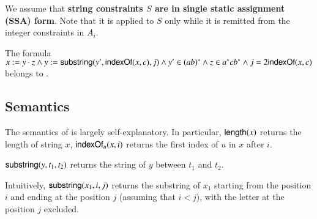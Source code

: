 {%
We assume that {\bf  string constraints %
$S$ are in single static assignment (SSA) form}.  %
Note that it is applied  to $S$ only while it is remitted from the integer constraints in $A_i$. 
%
%

\begin{example}
The formula $x:= y \cdot z \wedge y := \mathsf{substring}(y', \mathsf{indexOf}(x, c), j)  \wedge y' \in (ab)^* \wedge z \in a^* c b^* \wedge   j = 2 \mathsf{indexOf}(x, c)$ belongs to \slint.
\end{example}


\subsection{Semantics}

The semantics of  {\slint}  is largely self-explanatory. In particular, $\mathsf{length}(x)$ returns the length of string $x$, $\mathsf{indexOf}_u(x, i)$ returns the first index of $u$ in $x$ after $i$. 

$\mathsf{substring}(y, t_1, t_2)$ returns the string of $y$ between $t_1$ and $t_2$. 

Intuitively, $\mathsf{substring}(x_1, i, j)$ returns the substring of $x_1$ starting from the position $i$ and ending at the position $j$ (assuming that $i  < j$), with the letter at the position $j$ excluded.

}
